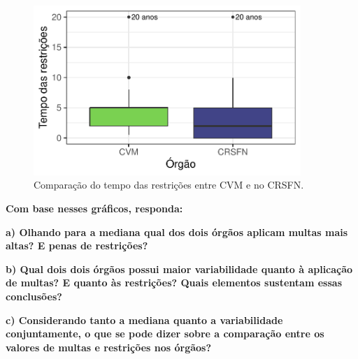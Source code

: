\documentclass[
  letterpaper,
  DIV=11,
  numbers=noendperiod]{scrartcl}
\begin{document}
\begin{figure}

{\centering \includegraphics[width=0.9\textwidth,height=\textheight]{e_pgd_files/figure-pdf/fig-boxplot-restricoes-1.pdf}

}

\caption{\label{fig-boxplot-restricoes}Comparação do tempo das
restrições entre CVM e no CRSFN.}

\end{figure}

\newpage{}

\textbf{Com base nesses gráficos, responda:}

\textbf{a) Olhando para a mediana qual dos dois órgãos aplicam multas
mais altas? E penas de restrições?}

\textbf{b) Qual dois dois órgãos possui maior variabilidade quanto à
aplicação de multas? E quanto às restrições? Quais elementos sustentam
essas conclusões?}

\textbf{c) Considerando tanto a mediana quanto a variabilidade
conjuntamente, o que se pode dizer sobre a comparação entre os valores
de multas e restrições nos órgãos?}
\end{document}
